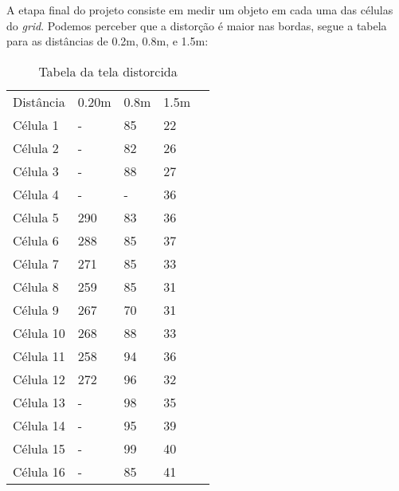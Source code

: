 \documentclass[conference,harvard,brazil,english]{sbatex}
\begin{document}
		\par A etapa final do projeto consiste em medir um objeto em cada uma das células do \textit{grid}. Podemos perceber que a distorção é maior nas bordas, segue a tabela para as distâncias de 0.2m, 0.8m, e 1.5m:
		\begin{table}[h]
			\centering
			\caption{Tabela da tela distorcida}
			\label{my-label}
			\begin{tabular}{lllll}
				Distância & 0.20m & 0.8m & 1.5m &  \\
				Célula 1  &   -   &  85  &  22  &  \\
				Célula 2  &   -   &  82  &  26  &  \\
				Célula 3  &   -   &  88  &  27  &  \\
				Célula 4  &   -   &  -   &  36  &  \\
				Célula 5  &  290  &  83  &  36  &  \\
				Célula 6  &  288  &  85  &  37  &  \\
				Célula 7  &  271  &  85  &  33  &  \\
				Célula 8  &  259  &  85  &  31  &  \\
				Célula 9  &  267  &  70  &  31  &  \\
				Célula 10 &  268  &  88  &  33  &  \\
				Célula 11 &  258  &  94  &  36  &  \\
				Célula 12 &  272  &  96  &  32  &  \\
				Célula 13 &   -   &  98  &  35  &  \\
				Célula 14 &   -   &  95  &  39  &  \\
				Célula 15 &   -   &  99  &  40  &  \\
				Célula 16 &   -   &  85  &  41  & 
			\end{tabular}
		\end{table}
\end{document}
